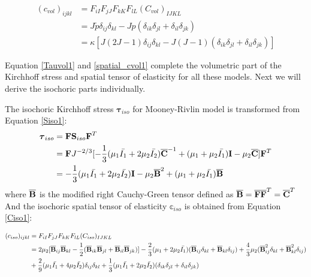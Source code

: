 \begin{subequations} \label{spatial_cvol1}
\begin{align}
(c_{vol})_{ijkl} &= F_{iI}F_{jJ}F_{kK}F_{lL}(C_{vol})_{IJKL} \\
&= J\tilde{p}\delta_{ij}\delta_{kl} - Jp(\delta_{ik}\delta_{jl} + \delta_{il}\delta_{jk}) \label{spatial_cvol11} \\
&= \kappa[J(2J-1)\delta_{ij}\delta_{kl} - J(J-1)(\delta_{ik}\delta_{jl} + \delta_{il}\delta_{jk})] \label{spatial_cvol12}
\end{align}
\end{subequations} 

Equation \ref{Tauvol1} and \ref{spatial_cvol1} complete the volumetric part of the Kirchhoff stress and spatial tensor of elasticity for all these models. Next we will derive the isochoric parts individually.

The isochoric Kirchhoff stress $\boldsymbol{\tau}_{iso}$ for Mooney-Rivlin model is transformed from Equation \ref{Siso1}:
\begin{equation} \label{Tauiso1}
\begin{split}
\boldsymbol{\tau}_{iso} &= \bold{F}\bold{S}_{iso}{\bold{F}}^T \\
	   			    &= \bold{F}  J^{-2/3} [    - \frac{1}{3}(\mu_1\bar{I_1} + 2\mu_2\bar{I_2}) \overline{\bold{C}}^{-1}  + (\mu_1 + \mu_2\bar{I_1})\bold{I} - \mu_2\overline{\bold{C}} ]   \bold{F}^T \\
				    &= - \frac{1}{3}(\mu_1\bar{I_1} + 2\mu_2\bar{I_2})\bold{I} - \mu_2{\overline{\bold{B}}}^2 + (\mu_1 + \mu_2\bar{I_1}){\overline{\bold{B}}}
\end{split}
\end{equation}
where $\overline{\bold{B}}$ is the modified right Cauchy-Green tensor defined as $\overline{\bold{B}} = \overline{\bold{F}}\overline{\bold{F}}^T = \overline{\bold{C}}^T$
And the isochoric spatial tensor of elasticity $\mathbb{c}_{iso}$ is obtained from Equation \ref{Ciso1}:

\begin{equation} \label{spatial_ciso1}
\begin{split}
(c_{iso})_{ijkl} &=  F_{iI}F_{jJ}F_{kK}F_{lL}(C_{iso})_{IJKL} \\
&= 
2\mu_2[{\overline{\bold{B}}}_{ij} {\overline{\bold{B}}}_{kl} - \frac{1}{2}({\overline{\bold{B}}}_{ik}{\overline{\bold{B}}}_{jl} + {\overline{\bold{B}}}_{il}{\overline{\bold{B}}}_{jk}) ] 
- \frac{2}{3}(\mu_1 + 2\mu_2\bar{I_1})({\overline{\bold{B}}}_{ij}\delta_{kl} + {\overline{\bold{B}}}_{kl}\delta_{ij}) 
+ \frac{4}{3}\mu_2({\overline{\bold{B}}}^2_{ij}\delta_{kl} + {\overline{\bold{B}}}^2_{kl}\delta_{ij}) \\
&+
\frac{2}{9}(\mu_1\bar{I_1} + 4\mu_2\bar{I_2}) \delta_{ij}\delta_{kl}
+ \frac{1}{3}(\mu_1\bar{I_1} + 2\mu_2\bar{I_2})(\delta_{ik}\delta_{jl} + \delta_{il}\delta_{jk})
\end{split}
\end{equation} 

